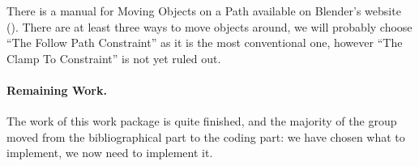 \par There is a manual for Moving Objects on a Path available on Blender's website (\cite{manual_moving}). There are at least three ways to move objects around, we will probably choose ``The Follow Path Constraint'' as it is the most conventional one, however ``The Clamp To Constraint'' is not yet ruled out.





\paragraph{Remaining Work.}
The work of this work package is quite finished, and the majority of the group moved from the bibliographical part to the coding part: we have chosen what to implement, we now need to implement it. 
